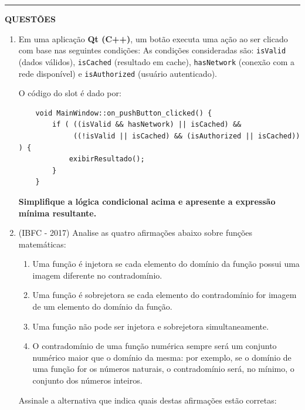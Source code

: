 \documentclass[12pt,a4paper]{article}
\newcommand{\resposta}[1]{
\noindent
\framebox[\textwidth]{
\begin{minipage}{0.98\textwidth}
\vspace{#1}
\end{minipage}
}
}
\begin{document}
\begin{center}
    \rule{\textwidth}{0.4pt}
    \textbf{QUESTÕES}
\end{center}

\vspace{0.5cm} 

\begin{enumerate}
     \item Em uma aplicação \textbf{Qt (C++)}, um botão executa uma ação ao ser clicado com base nas seguintes condições:
As condições consideradas são: \texttt{isValid} (dados válidos), \texttt{isCached} (resultado em cache), \texttt{hasNetwork} (conexão com a rede disponível) e \texttt{isAuthorized} (usuário autenticado).
    
    O código do slot é dado por:
    
    \begin{codeblock}
    \begin{verbatim}
    void MainWindow::on_pushButton_clicked() {
        if ( ((isValid && hasNetwork) || isCached) &&
             ((!isValid || isCached) && (isAuthorized || isCached)) ) {
            exibirResultado();
        }
    }
    \end{verbatim}
    \end{codeblock}

    \textbf{Simplifique a lógica condicional acima e apresente a expressão mínima resultante.}
    
    \resposta{4cm}
       \item (IBFC - 2017) Analise as quatro afirmações abaixo sobre funções matemáticas:
    
    \begin{enumerate}[label=\Roman*.]
        \item Uma função é injetora se cada elemento do domínio da função possui uma imagem diferente no contradomínio.
        \item Uma função é sobrejetora se cada elemento do contradomínio for imagem de um elemento do domínio da função.
        \item Uma função não pode ser injetora e sobrejetora simultaneamente.
        \item O contradomínio de uma função numérica sempre será um conjunto numérico maior que o domínio da mesma: por exemplo, se o domínio de uma função for os números naturais, o contradomínio será, no mínimo, o conjunto dos números inteiros.
    \end{enumerate}

    Assinale a alternativa que indica quais destas afirmações estão corretas:


\end{enumerate}
\end{document}
